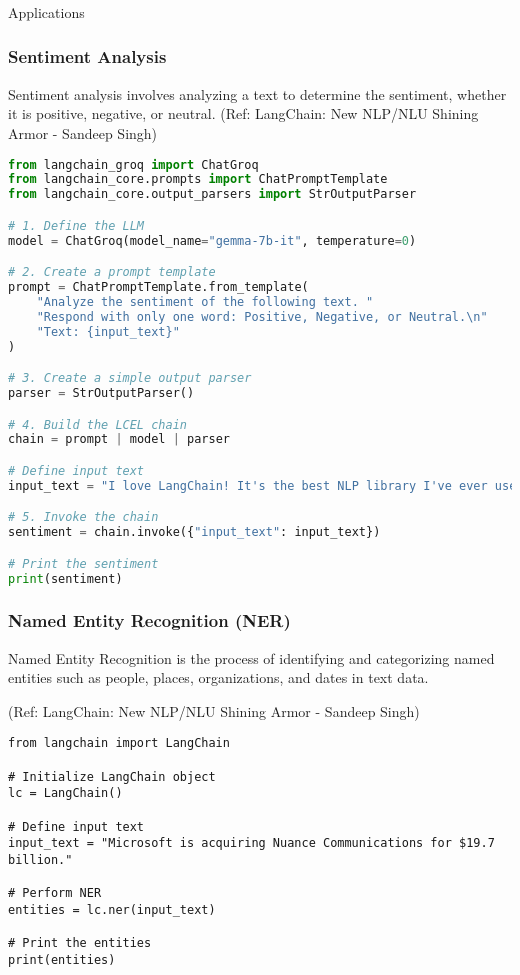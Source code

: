\begin{frame}[fragile]\frametitle{}
\begin{center}
{\Large Applications}
\end{center}
\end{frame}

\begin{frame}[fragile]\frametitle{Sentiment Analysis}

Sentiment analysis involves analyzing a text to determine the sentiment, whether it is positive, negative, or neutral.
{\tiny (Ref: LangChain: New NLP/NLU Shining Armor - Sandeep Singh)}

\begin{lstlisting}[language=python, basicstyle=\tiny]
from langchain_groq import ChatGroq
from langchain_core.prompts import ChatPromptTemplate
from langchain_core.output_parsers import StrOutputParser

# 1. Define the LLM
model = ChatGroq(model_name="gemma-7b-it", temperature=0)

# 2. Create a prompt template
prompt = ChatPromptTemplate.from_template(
    "Analyze the sentiment of the following text. "
    "Respond with only one word: Positive, Negative, or Neutral.\n"
    "Text: {input_text}"
)

# 3. Create a simple output parser
parser = StrOutputParser()

# 4. Build the LCEL chain
chain = prompt | model | parser

# Define input text
input_text = "I love LangChain! It's the best NLP library I've ever used."

# 5. Invoke the chain
sentiment = chain.invoke({"input_text": input_text})

# Print the sentiment
print(sentiment)
\end{lstlisting}	  

\end{frame}

\begin{frame}[fragile]\frametitle{Named Entity Recognition (NER)}

Named Entity Recognition is the process of identifying and categorizing named entities such as people, places, organizations, and dates in text data.

{\tiny (Ref: LangChain: New NLP/NLU Shining Armor - Sandeep Singh)}

\begin{lstlisting}
from langchain import LangChain

# Initialize LangChain object
lc = LangChain()

# Define input text
input_text = "Microsoft is acquiring Nuance Communications for $19.7 billion."

# Perform NER
entities = lc.ner(input_text)

# Print the entities
print(entities)
\end{lstlisting}	  

\end{frame}

